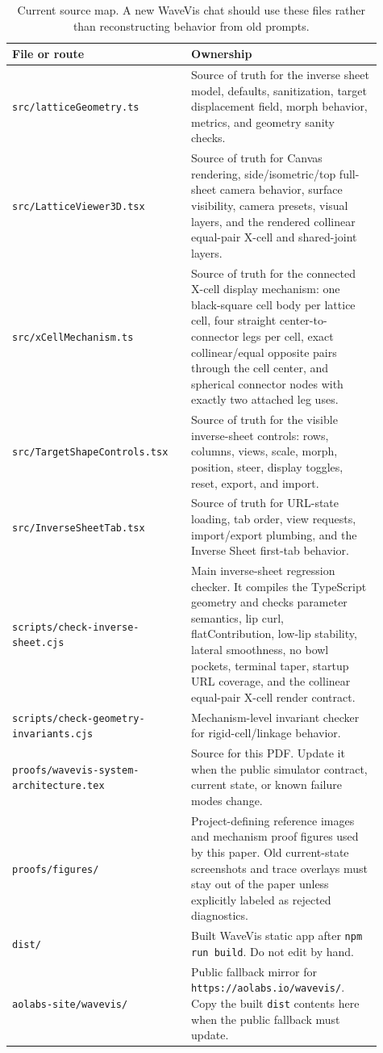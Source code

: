 \documentclass[12pt,letterpaper]{article}
\newcommand{\code}[1]{\texttt{#1}}
\begin{document}
\begin{table}[H]
\centering
{\footnotesize
\begin{tabular}{Y{0.43\linewidth}Y{0.48\linewidth}}
\toprule
File or route & Ownership \\
\midrule
\code{src/latticeGeometry.ts} & Source of truth for the inverse sheet model, defaults, sanitization, target displacement field, morph behavior, metrics, and geometry sanity checks. \\
\code{src/LatticeViewer3D.tsx} & Source of truth for Canvas rendering, side/isometric/top full-sheet camera behavior, surface visibility, camera presets, visual layers, and the rendered collinear equal-pair X-cell and shared-joint layers. \\
\code{src/xCellMechanism.ts} & Source of truth for the connected X-cell display mechanism: one black-square cell body per lattice cell, four straight center-to-connector legs per cell, exact collinear/equal opposite pairs through the cell center, and spherical connector nodes with exactly two attached leg uses. \\
\code{src/TargetShapeControls.tsx} & Source of truth for the visible inverse-sheet controls: rows, columns, views, scale, morph, position, steer, display toggles, reset, export, and import. \\
\code{src/InverseSheetTab.tsx} & Source of truth for URL-state loading, tab order, view requests, import/export plumbing, and the Inverse Sheet first-tab behavior. \\
\code{scripts/check-inverse-sheet.cjs} & Main inverse-sheet regression checker. It compiles the TypeScript geometry and checks parameter semantics, lip curl, flatContribution, low-lip stability, lateral smoothness, no bowl pockets, terminal taper, startup URL coverage, and the collinear equal-pair X-cell render contract. \\
\code{scripts/check-geometry-invariants.cjs} & Mechanism-level invariant checker for rigid-cell/linkage behavior. \\
\code{proofs/wavevis-system-architecture.tex} & Source for this PDF. Update it when the public simulator contract, current state, or known failure modes change. \\
\code{proofs/figures/} & Project-defining reference images and mechanism proof figures used by this paper. Old current-state screenshots and trace overlays must stay out of the paper unless explicitly labeled as rejected diagnostics. \\
\code{dist/} & Built WaveVis static app after \code{npm run build}. Do not edit by hand. \\
\code{aolabs-site/wavevis/} & Public fallback mirror for \code{https://aolabs.io/wavevis/}. Copy the built \code{dist} contents here when the public fallback must update. \\
\bottomrule
\end{tabular}
}
\caption{Current source map. A new WaveVis chat should use these files rather than reconstructing behavior from old prompts.}
\end{table}
\end{document}
